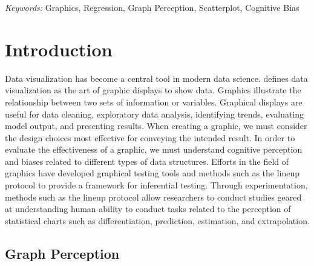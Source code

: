 \documentclass[12pt]{article}
\begin{document}
\noindent%
{\it Keywords:} Graphics, Regression, Graph
Perception, Scatterplot, Cognitive Bias
\vfill

\newpage
{} %

\hypertarget{introduction}{%
\section{Introduction}\label{introduction}}

Data visualization has become a central tool in modern data science.
\citet{unwin2020data} defines data visualization as the art of graphic
displays to show data. Graphics illustrate the relationship between two
sets of information or variables. Graphical displays are useful for data
cleaning, exploratory data analysis, identifying trends, evaluating
model output, and presenting results. When creating a graphic, we must
consider the design choices most effective for conveying the intended
result. In order to evaluate the effectiveness of a graphic, we must
understand cognitive perception and biases related to different types of
data structures. Efforts in the field of graphics have developed
graphical testing tools and methods such as the lineup protocol
\citep{buja2009statistical} to provide a framework for inferential
testing. Through experimentation, methods such as the lineup protocol
allow researchers to conduct studies geared at understanding human
ability to conduct tasks related to the perception of statistical charts
such as differentiation, prediction, estimation, and extrapolation.

\hypertarget{graph-perception}{%
\subsection{Graph Perception}\label{graph-perception}}
\end{document}

